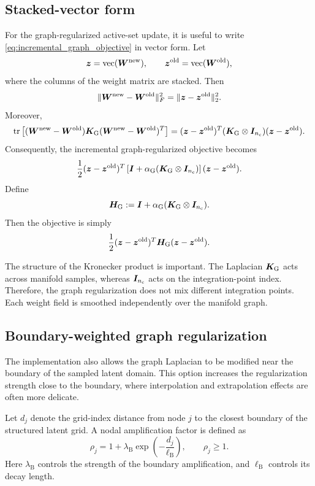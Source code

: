 \documentclass[11pt,a4paper]{article}
\begin{document}
\subsection{Stacked-vector form}

For the graph-regularized active-set update, it is useful to write
\eqref{eq:incremental_graph_objective} in vector form. Let
\[
        \bm z = \operatorname{vec}(\bm W^{\mathrm{new}}),
        \qquad
        \bm z^{\mathrm{old}} = \operatorname{vec}(\bm W^{\mathrm{old}}),
\]
where the columns of the weight matrix are stacked. Then
\[
        \|\bm W^{\mathrm{new}}-\bm W^{\mathrm{old}}\|_F^2
        =
        \|\bm z-\bm z^{\mathrm{old}}\|_2^2.
\]
Moreover,
\[
        \operatorname{tr}\left[
        (\bm W^{\mathrm{new}}-\bm W^{\mathrm{old}})\bm K_{\mathrm{G}}(\bm W^{\mathrm{new}}-\bm W^{\mathrm{old}})^T
        \right]
        =
        (\bm z-\bm z^{\mathrm{old}})^T
        (\bm K_{\mathrm{G}}\otimes\bm I_{n_{\mathrm{c}}})
        (\bm z-\bm z^{\mathrm{old}}).
\]
Consequently, the incremental graph-regularized objective becomes
\[
        \frac{1}{2}
        (\bm z-\bm z^{\mathrm{old}})^T
        \left[
        \bm I + \alpha_{\mathrm{G}}(\bm K_{\mathrm{G}}\otimes\bm I_{n_{\mathrm{c}}})
        \right]
        (\bm z-\bm z^{\mathrm{old}}).
        \label{eq:stacked_graph_objective}
\]
Define
\[
        \bm H_{\mathrm{G}}
        :=
        \bm I + \alpha_{\mathrm{G}}(\bm K_{\mathrm{G}}\otimes\bm I_{n_{\mathrm{c}}}).
        \label{eq:Hgraph_definition}
\]
Then the objective is simply
\[
        \frac{1}{2}
        (\bm z-\bm z^{\mathrm{old}})^T\bm H_{\mathrm{G}}(\bm z-\bm z^{\mathrm{old}}).
\]

The structure of the Kronecker product is important. The Laplacian
$\bm K_{\mathrm{G}}$ acts across manifold samples, whereas $\bm I_{n_{\mathrm{c}}}$ acts on the
integration-point index. Therefore, the graph regularization does not mix
different integration points. Each weight field is smoothed independently over
the manifold graph.

\subsection{Boundary-weighted graph regularization}

The implementation also allows the graph Laplacian to be modified near the
boundary of the sampled latent domain. This option increases the regularization
strength close to the boundary, where interpolation and extrapolation effects
are often more delicate.

Let $d_j$ denote the grid-index distance from node $j$ to the closest boundary
of the structured latent grid. A nodal amplification factor is defined as
\[
        \rho_j
        =
        1+\lambda_{\mathrm{B}}
        \exp\left(-\frac{d_j}{\ell_{\mathrm{B}}}\right),
        \qquad
        \rho_j\geq 1.
\]
Here $\lambda_{\mathrm{B}}$ controls the strength of the boundary
amplification, and $\ell_{\mathrm{B}}$ controls its decay length.
\end{document}
